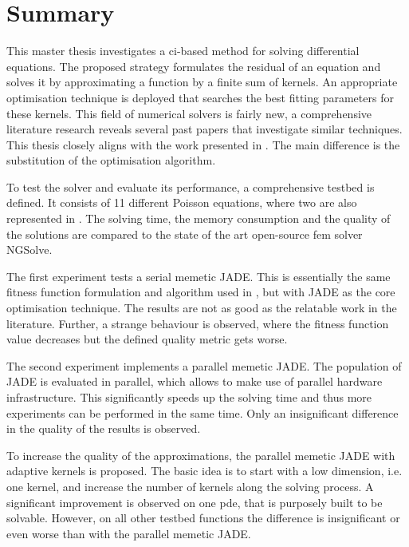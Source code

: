 \documentclass[./\jobname.tex]{subfiles}
\begin{document}
\chapter{Summary}

This master thesis investigates a \gls{ci}-based method for solving differential equations. The proposed strategy formulates the residual of an equation and solves it by approximating a function by a finite sum of kernels. An appropriate optimisation technique is deployed that searches the best fitting parameters for these kernels. This field of numerical solvers is fairly new, a comprehensive literature research reveals several past papers that investigate similar techniques. This thesis closely aligns with the work presented in \cite{chaquet_using_2019}. The main difference is the substitution of the optimisation algorithm. 

To test the solver and evaluate its performance, a comprehensive testbed is defined. It consists of 11 different Poisson equations, where two are also represented in \cite{chaquet_using_2019}. The solving time, the memory consumption and the quality of the solutions are compared to the state of the art open-source \gls{fem} solver NGSolve. 

The first experiment tests a serial memetic JADE. This is essentially the same fitness function formulation and algorithm used in \cite{chaquet_using_2019}, but with JADE as the core optimisation technique. The results are not as good as the relatable work in the literature. Further, a strange behaviour is observed, where the fitness function value decreases but the defined quality metric gets worse. 

The second experiment implements a parallel memetic JADE. The population of JADE is evaluated in parallel, which allows to make use of parallel hardware infrastructure. This significantly speeds up the solving time and thus more experiments can be performed in the same time. Only an insignificant difference in the quality of the results is observed. 

To increase the quality of the approximations, the parallel memetic JADE with adaptive kernels is proposed. The basic idea is to start with a low dimension, i.e. one kernel, and increase the number of kernels along the solving process. A significant improvement is observed on one \gls{pde}, that is purposely built to be solvable. However, on all other testbed functions the difference is insignificant or even worse than with the parallel memetic JADE. 
\end{document}
